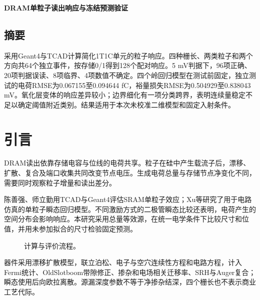 \documentclass[UTF8,a4paper,zihao=-4,fontset=fandol]{ctexart}
\begin{document}
\begin{center}
{\LARGE\bfseries\color{ink}DRAM单粒子读出响应与冻结预测验证\par}
\vspace{.5em}{指导教师：李洋\qquad 2026年10月11日}
\end{center}
\subsection*{摘要}
采用Geant4与TCAD计算简化1T1C单元的粒子响应。四种栅长、两类粒子和两个方向共64个独立事件，按存储0/1得到128个配对响应。5 mV判据下，96项正确、20项判据误读、8项临界、4项数值不确定。四个岭回归模型在测试前固定，独立测试的电荷RMSE为0.067155至0.094644 fC，裕量损失RMSE为0.504929至0.838043 mV。氧化层变体的响应差异较小；边界细化有一项分类跨界，表明连续量稳定不足以确定阈值附近类别。结果适用于本次未校准二维模型和固定入射条件。

\section{引言}
DRAM读出依靠存储电容与位线的电荷共享\cite{keeth2001}。粒子在硅中产生载流子后，漂移、扩散、复合及端口收集共同改变节点电压\cite{label1996}。生成电荷总量与存储节点净变化不同，需要同时观察粒子增量和读出差分。

陈善强、师立勤用TCAD与Geant4评估SRAM单粒子效应\cite{chen2011}；Xu等研究了用于电路仿真的单粒子瞬态回归模型\cite{xu2021}。不同激励方式的二极管瞬态比较还表明，电荷产生的空间分布会影响响应\cite{ryder2021}。本研究采用总量等效源，在统一电学条件下比较尺寸和位值，并用未参加拟合的尺寸检验固定预测。

\begin{figure}[H]\centering\workflowdiagram\caption{计算与评价流程。}\end{figure}

\begin{table}[H]\centering\small\caption{二维1T1C模型参数。各数值为探索设定。}\paramtable\end{table}
器件采用漂移扩散模型，联立泊松、电子与空穴连续性方程和电路方程，计入Fermi统计、OldSlotboom带隙修正、掺杂和电场相关迁移率、SRH与Auger复合；瞬态使用后向欧拉离散。源漏深度参数不等于净掺杂结深，四个栅长也不表示商业工艺代际。
\end{document}
